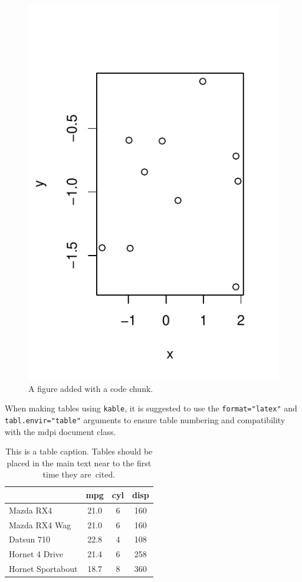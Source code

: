 \documentclass[notspecified,article,submit,moreauthors,pdftex]{Definitions/mdpi}
\begin{document}
\begin{figure}
\centering
\includegraphics{ProyectoAED2024_Rmd_files/figure-latex/fig1-1.pdf}
\caption{A figure added with a code chunk.\label{fig:fig1}}
\end{figure}

When making tables using \texttt{kable}, it is suggested to use the
\texttt{format="latex"} and \texttt{tabl.envir="table"} arguments to
ensure table numbering and compatibility with the mdpi document class.

\begin{table}[H]

\caption{\label{tab:tab1}This is a table caption. Tables should be placed in the 
             main text near to the first time they are~cited.}
\begin{tabular}[t]{lccc}
\toprule
  & mpg & cyl & disp\\
\midrule
Mazda RX4 & 21.0 & 6 & 160\\
Mazda RX4 Wag & 21.0 & 6 & 160\\
Datsun 710 & 22.8 & 4 & 108\\
Hornet 4 Drive & 21.4 & 6 & 258\\
Hornet Sportabout & 18.7 & 8 & 360\\
\bottomrule
\end{tabular}
\end{table}
\end{document}
